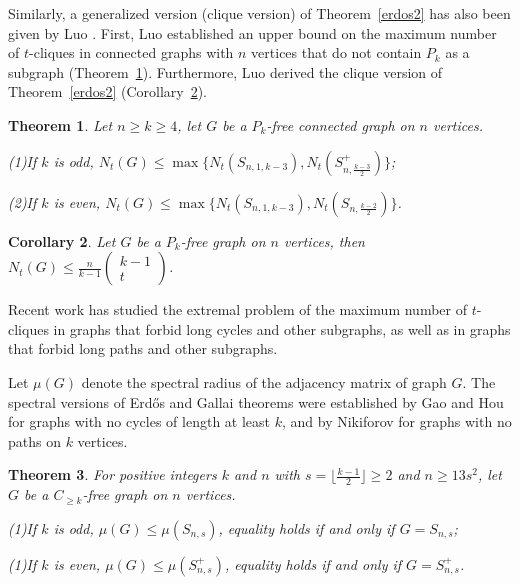 \documentclass[preprint,12pt]{elsarticle}
\newtheorem{thm}{Theorem}[section]
\newtheorem{cor}[thm]{Corollary}
\begin{document}
        Similarly, a generalized version (clique version) of Theorem~\ref{erdos2} has also been given by Luo \cite{Luo2018}. First, Luo established an upper bound on the maximum number of $t$-cliques in connected graphs with $n$ vertices that do not contain $P_k$ as a subgraph (Theorem~\ref{CT2-4}). Furthermore, Luo derived the clique version of Theorem~\ref{erdos2} (Corollary~\ref{CT2-5}).
        \begin{thm}\label{CT2-4}\cite{Luo2018}
            Let $n \geq k \geq 4$, let $G$ be a $P_k$-free connected graph on $n$ vertices.

            \noindent (1)If $k$ is odd, $N_t(G) \leq \max\{N_t(S_{n,1,k-3}), N_t(S_{n, \frac{k-3}{2} }^+)\}$;

            \noindent (2)If $k$ is even, $N_t(G) \leq \max\{N_t(S_{n,1,k-3}), N_t(S_{n, \frac{k-2}{2} })\}$.

		\end{thm}
        \begin{cor}\label{CT2-5}\cite{Luo2018}
            Let $G$ be a $P_{{k}}$-free graph on $n$ vertices, then
            $N_t(G) \leq \frac{n}{k-1}\begin{pmatrix}k-1\\t\end{pmatrix}$.
		\end{cor}

        Recent work \cite{Zhao2024, Lu2025, Fang2025} has studied the extremal problem of the maximum number of $t$-cliques in graphs that forbid long cycles and other subgraphs, as well as in graphs that forbid long paths and other subgraphs.


        Let $\mu(G)$ denote the spectral radius of the adjacency matrix of graph $G$. The spectral versions of Erd\H{o}s and Gallai theorems were established by Gao and Hou \cite{Gao2019} for graphs with no cycles of length at least $k$, and by Nikiforov \cite{Nikiforov2010} for graphs with no paths on $k$ vertices.



        \begin{thm}\label{CT2}\cite{Gao2019}
            For positive integers $k$ and $n$ with $s = \lfloor \frac{k-1}{2} \rfloor \geq 2$ and $n \geq 13{s}^2$, let $G$ be a $C_{\geq k}$-free graph on $n$ vertices.

            \noindent (1)If $k $ is odd, $\mu(G) \leq \mu(S_{n,s})$, equality holds if and only if $G = S_{n,s}$;

            \noindent (1)If $k $ is even, $\mu(G) \leq \mu(S_{n,s}^+)$, equality holds if and only if $G = S_{n,s}^+$.
		\end{thm}
\end{document}
